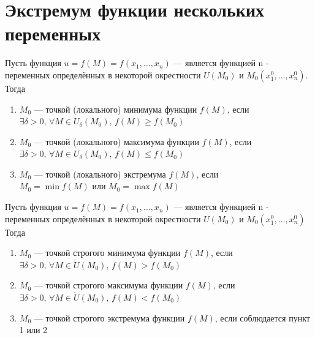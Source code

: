 \author{Andrei Tkachuk}

\section{Экстремум функции нескольких переменных}

    \begin{Def}
		Пусть функция $u = f(M) = f(x_1, \dots, x_n)$ --- является функцией n - переменных определённых в некоторой окрестности $U(M_0)$ и $M_0(x^0_1, \dots, x^0_n)$.\\
		Тогда
		\begin{enumerate}
			\item $M_0$ --- точкой (локального) минимума функции $f(M)$, если \\ 
            $\exists \delta > 0, \, \forall M \in U_\delta(M_0), \, f(M) \geqslant f(M_0)$
			
            \item $M_0$ --- точкой (локального) максимума функции $f(M)$, если \\ 
            $\exists \delta > 0, \, \forall M \in U_\delta(M_0), \, f(M) \leqslant f(M_0)$
            
        	\item $M_0$ --- точкой (локального) экстремума $f(M)$, если \\
             $M_0 = \min f(M)$ или $M_0 = \max f(M)$
		\end{enumerate}
	\end{Def}
	\begin{Def}
		Пусть функция $u = f(M) = f(x_1, \dots, x_n)$ --- является функцией n - переменных определённых в некоторой окрестности $U(M_0)$ и $M_0(x^0_1, \dots, x^0_n)$\\
		Тогда
		\begin{enumerate}
			\item $M_0$ --- точкой строгого минимума функции $f(M)$, если\\
            $\exists \delta > 0, \, \forall M \in \mathring{U}(M_0), \, f(M) > f(M_0)$
            
			\item $M_0$ --- точкой строгого максимума функции $f(M)$, если\\
            $\exists \delta > 0, \, \forall M \in \mathring{U}(M_0), \, f(M) < f(M_0)$
			
            \item $M_0$ --- точкой строгого экстремума функции $f(M)$, если соблюдается пункт 1 или 2
		\end{enumerate}	
	\end{Def}

